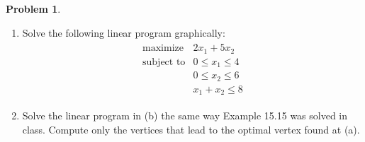 \documentclass[12pt]{article}
\theoremstyle{definition}
\newtheorem{problem}{Problem}
\begin{document}
\begin{problem}
  \begin{enumerate}
    \item Solve the following linear program graphically:
      \begin{align*}
        \begin{array}{ll}
          \text{maximize} & 2x_1 + 5x_2 \\
          \text{subject to} & 0 \leq x_1 \leq 4 \\
          & 0 \leq x_2 \leq 6 \\
          & x_1 + x_2 \leq 8
        \end{array}
      \end{align*}
    \item Solve the linear program in (b) the same way Example 15.15 was solved in class.
      Compute only the vertices that lead to the optimal vertex found at (a).
  \end{enumerate}
\end{problem}
\end{document}
